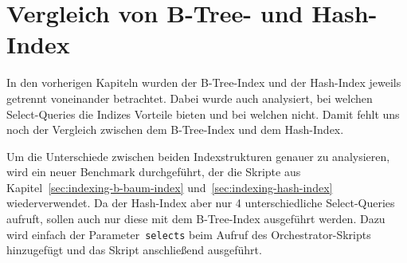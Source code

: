 \section{Vergleich von B-Tree- und Hash-Index}\label{sec:indexing-comp-b-tree-hash-index}

In den vorherigen Kapiteln wurden der B-Tree-Index und der Hash-Index jeweils getrennt voneinander betrachtet.
Dabei wurde auch analysiert, bei welchen Select-Queries die Indizes Vorteile bieten und bei welchen nicht.
Damit fehlt uns noch der Vergleich zwischen dem B-Tree-Index und dem Hash-Index.

Um die Unterschiede zwischen beiden Indexstrukturen genauer zu analysieren, wird ein neuer Benchmark durchgeführt, der die Skripte aus Kapitel~\ref{sec:indexing-b-baum-index} und~\ref{sec:indexing-hash-index} wiederverwendet.
Da der Hash-Index aber nur 4 unterschiedliche Select-Queries aufruft, sollen auch nur diese mit dem B-Tree-Index ausgeführt werden.
Dazu wird einfach der Parameter~\texttt{selects} beim Aufruf des Orchestrator-Skripts hinzugefügt und das Skript anschließend ausgeführt.

